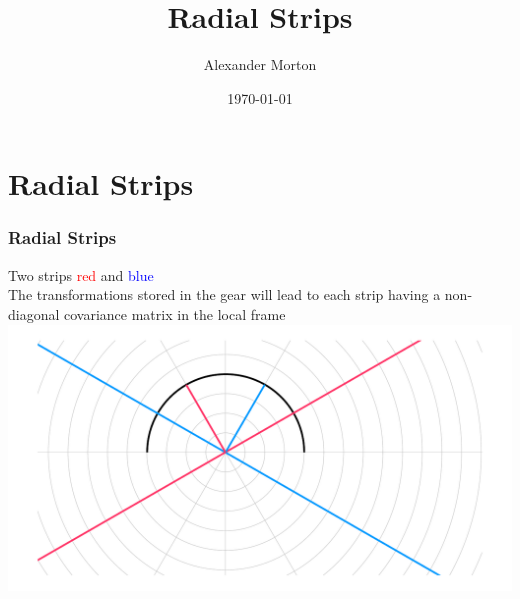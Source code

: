 \documentclass{beamer}
\title[Radial Strips]{Radial Strips} %
\author{Alexander Morton} %
\institute[Glasgow] %
{
University of Glasgow \\ %
\medskip
\textit{a.morton.2@research.com} %
}
\date{\today} %
\begin{document}
\begin{frame}
\titlepage %
\end{frame}





\section{Radial Strips}
\begin{frame}
\frametitle{Radial Strips}
Two strips \textcolor{red}{red} and \textcolor{blue}{blue} \\
The transformations stored in the gear will lead to each strip having a non-diagonal covariance matrix in the local frame \\
\includegraphics[scale=0.50]{pics/radial.pdf}
\end{frame}
\end{document}
